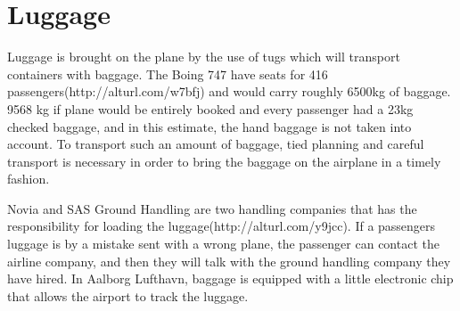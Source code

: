 \section{Luggage}
Luggage is brought on the plane by the use of tugs which will transport containers with baggage. The Boing 747 have seats for 416 passengers(http://alturl.com/w7bfj) and would carry roughly 6500kg of baggage. 9568 kg if plane would be entirely booked and every passenger had a 23kg checked baggage, and in this estimate, the hand baggage is not taken into account. To transport such an amount of baggage, tied planning and careful transport is necessary in order to bring the baggage on the airplane in a timely fashion.


Novia and SAS Ground Handling are two handling companies that has the responsibility for loading the luggage(http://alturl.com/y9jcc). If a passengers luggage is by a mistake sent with a wrong plane, the passenger can contact the airline company, and then they will talk with the ground handling company they have hired. In Aalborg Lufthavn, baggage is equipped with a little electronic chip that allows the airport to track the luggage.